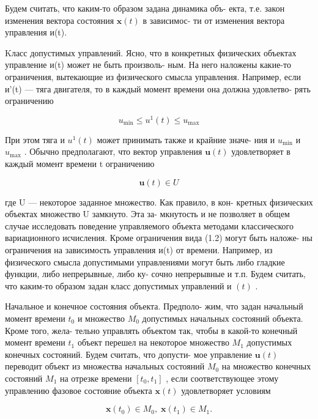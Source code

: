 \documentclass[8pt]{extarticle}
\begin{document}
Будем считать, что каким-то образом задана динамика объ- екта, т.е. закон изменения вектора состояния \(\mathbf{x}\left( t\right)\) в зависимос- ти от изменения вектора управления и(t).

Kласс допустимых управлений. Ясно, что в конкретных физических объектах управление и(t) может не быть произволь- ным. На него наложены какие-то ограничения, вытекающие из физического смысла управления. Например, если и'(t) — тяга двигателя, то в каждый момент времени она должна удовлетво- рять ограничению

\[
{u}_{\min } \leq  {u}^{1}\left( t\right)  \leq  {u}_{\max }
\]

При этом тяга и \({u}^{1}\left( t\right)\) может принимать также и крайние значе- ния и \({u}_{\min }\) и \({u}_{\max }\) . Обычно предполагают, что вектор управления \(\mathbf{u}\left( t\right)\) удовлетворяет в каждый момент времени t ограничению

\[
\mathbf{u}\left( t\right)  \in  U \tag{1.2}
\]

где U — некоторое заданное множество. Как правило, в кон- кретных физических объектах множество U замкнуто. Эта за- мкнутость и не позволяет в общем случае исследовать поведение управляемого объекта методами классического вариационного исчисления. Кроме ограничения вида (1.2) могут быть наложе- ны ограничения на зависимость управления и(t) от времени. Например, из физического смысла допустимыми управлениями могут быть либо гладкие функции, либо непрерывные, либо ку- сочно непрерывные и т.п. Будем считать, что каким-то образом задан класс допустимых управлений и \(\left( t\right)\) .

Начальное и конечное состояния объекта. Предполо- жим, что задан начальный момент времени \({t}_{0}\) и множество \({M}_{0}\) допустимых начальных состояний объекта. Кроме того, жела- тельно управлять объектом так, чтобы в какой-то конечный момент времени \({t}_{1}\) объект перешел на некоторое множество \({M}_{1}\) допустимых конечных состояний. Будем считать, что допусти- мое управление \(\mathbf{u}\left( t\right)\) переводит объект из множества начальных состояний \({M}_{0}\) на множество конечных состояний \({M}_{1}\) на отрезке времени \(\left\lbrack  {{t}_{0},{t}_{1}}\right\rbrack\) , если соответствующее этому управлению фазовое состояние объекта \(\mathbf{x}\left( t\right)\) удовлетворяет условиям

\[
\mathbf{x}\left( {t}_{0}\right)  \in  {M}_{0},\;\mathbf{x}\left( {t}_{1}\right)  \in  {M}_{1}. \tag{1.3}
\]
\end{document}
